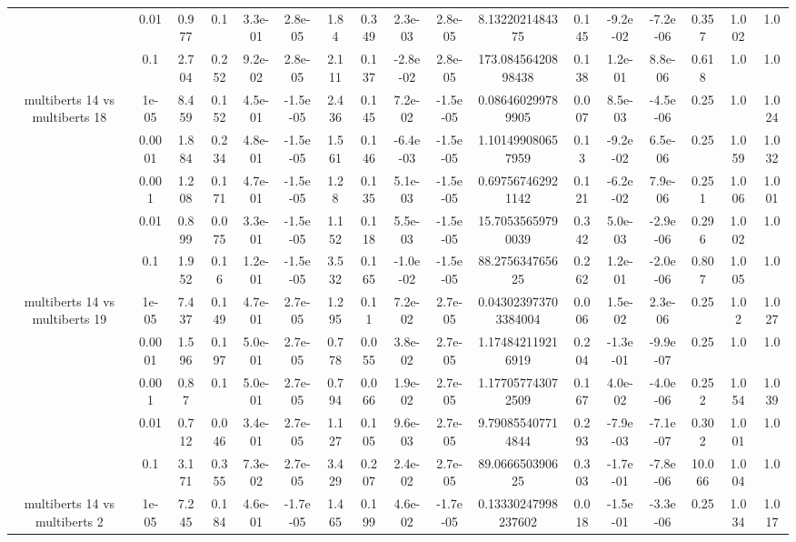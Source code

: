 \begin{tabular}{|c|c|c|c|c|c|c|c|c|c|c|c|c|c|c|c|c|}
 & 0.01 & 0.977 & 0.1 & 3.3e-01 & 2.8e-05 & 1.84 & 0.349 & 2.3e-03 & 2.8e-05 & 8.1322021484375 & 0.145 & -9.2e-02 & -7.2e-06 & 0.357 & 1.002 & 1.0 \\
 & 0.1 & 2.704 & 0.252 & 9.2e-02 & 2.8e-05 & 2.111 & 0.137 & -2.8e-02 & 2.8e-05 & 173.08456420898438 & 0.138 & 1.2e-01 & 8.8e-06 & 0.618 & 1.0 & 1.0 \\
\hline
\multirow{5}{*}{multiberts 14 vs multiberts 18} & 1e-05 & 8.459 & 0.152 & 4.5e-01 & -1.5e-05 & 2.436 & 0.145 & 7.2e-02 & -1.5e-05 & 0.086460299789905 & 0.007 & 8.5e-03 & -4.5e-06 & 0.25 & 1.0 & 1.024 \\
 & 0.0001 & 1.884 & 0.234 & 4.8e-01 & -1.5e-05 & 1.561 & 0.146 & -6.4e-03 & -1.5e-05 & 1.101499080657959 & 0.13 & -9.2e-02 & 6.5e-06 & 0.25 & 1.059 & 1.032 \\
 & 0.001 & 1.208 & 0.171 & 4.7e-01 & -1.5e-05 & 1.28 & 0.135 & 5.1e-03 & -1.5e-05 & 0.697567462921142 & 0.121 & -6.2e-02 & 7.9e-06 & 0.251 & 1.006 & 1.001 \\
 & 0.01 & 0.899 & 0.075 & 3.3e-01 & -1.5e-05 & 1.152 & 0.118 & 5.5e-03 & -1.5e-05 & 15.70535659790039 & 0.342 & 5.0e-03 & -2.9e-06 & 0.296 & 1.002 & 1.0 \\
 & 0.1 & 1.952 & 0.16 & 1.2e-01 & -1.5e-05 & 3.532 & 0.165 & -1.0e-02 & -1.5e-05 & 88.275634765625 & 0.262 & 1.2e-01 & -2.0e-06 & 0.807 & 1.005 & 1.0 \\
\hline
\multirow{5}{*}{multiberts 14 vs multiberts 19} & 1e-05 & 7.437 & 0.149 & 4.7e-01 & 2.7e-05 & 1.295 & 0.11 & 7.2e-02 & 2.7e-05 & 0.043023973703384004 & 0.006 & 1.5e-02 & 2.3e-06 & 0.25 & 1.02 & 1.027 \\
 & 0.0001 & 1.596 & 0.197 & 5.0e-01 & 2.7e-05 & 0.778 & 0.055 & 3.8e-02 & 2.7e-05 & 1.174842119216919 & 0.204 & -1.3e-01 & -9.9e-07 & 0.25 & 1.0 & 1.0 \\
 & 0.001 & 0.87 & 0.1 & 5.0e-01 & 2.7e-05 & 0.794 & 0.066 & 1.9e-02 & 2.7e-05 & 1.177057743072509 & 0.167 & 4.0e-02 & -4.0e-06 & 0.252 & 1.054 & 1.039 \\
 & 0.01 & 0.712 & 0.046 & 3.4e-01 & 2.7e-05 & 1.127 & 0.105 & 9.6e-03 & 2.7e-05 & 9.790855407714844 & 0.293 & -7.9e-03 & -7.1e-07 & 0.302 & 1.001 & 1.0 \\
 & 0.1 & 3.171 & 0.355 & 7.3e-02 & 2.7e-05 & 3.429 & 0.207 & 2.4e-02 & 2.7e-05 & 89.066650390625 & 0.303 & -1.7e-01 & -7.8e-06 & 10.066 & 1.004 & 1.0 \\
\hline
\multirow{5}{*}{multiberts 14 vs multiberts 2} & 1e-05 & 7.245 & 0.184 & 4.6e-01 & -1.7e-05 & 1.465 & 0.199 & 4.6e-02 & -1.7e-05 & 0.13330247998237602 & 0.018 & -1.5e-01 & -3.3e-06 & 0.25 & 1.034 & 1.017 \\

\end{tabular}
